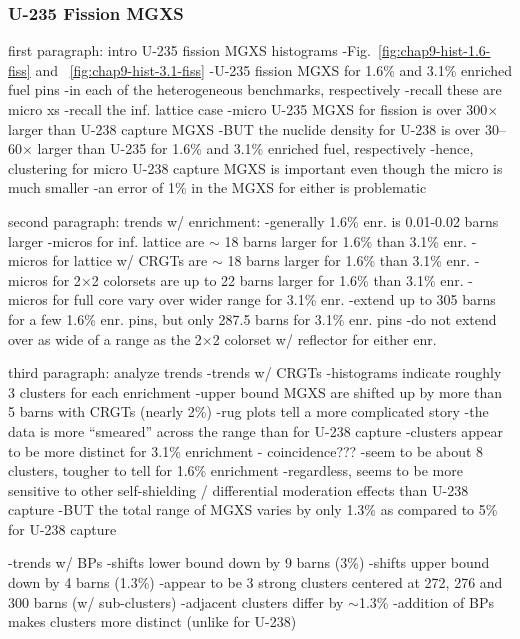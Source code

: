 \subsubsection{U-235 Fission MGXS}
\label{subsubsec:chap9-histograms-fiss}

first paragraph: intro U-235 fission \ac{MGXS} histograms
-Fig.~\ref{fig:chap9-hist-1.6-fiss} and ~\ref{fig:chap9-hist-3.1-fiss}
  -U-235 fission \ac{MGXS} for 1.6\% and 3.1\% enriched fuel pins
  -in each of the heterogeneous benchmarks, respectively
-recall these are micro xs
-recall the inf. lattice case
-micro U-235 \ac{MGXS} for fission is over 300$\times$ larger than U-238 capture \ac{MGXS}
  -BUT the nuclide density for U-238 is over 30--60$\times$ larger than U-235 for 1.6\% and 3.1\% enriched fuel, respectively
  -hence, clustering for micro U-238 capture \ac{MGXS} is important even though the micro is much smaller
  -an error of 1\% in the \ac{MGXS} for either is problematic

second paragraph: trends w/ enrichment:
-generally 1.6\% enr. is 0.01-0.02 barns larger
  -micros for inf. lattice are $\sim$ 18 barns larger for 1.6\% than 3.1\% enr.
  -micros for lattice w/ \acp{CRGT} are $\sim$ 18 barns larger for 1.6\% than 3.1\% enr.
  -micros for 2$\times$2 colorsets are up to 22 barns larger for 1.6\% than 3.1\% enr.
  -micros for full core vary over wider range for 3.1\% enr.
    -extend up to 305 barns for a few 1.6\% enr. pins, but only 287.5 barns for 3.1\% enr. pins
    -do not extend over as wide of a range as the 2$\times$2 colorset w/ reflector for either enr.

third paragraph: analyze trends
-trends w/ \acp{CRGT}
  -histograms indicate roughly 3 clusters for each enrichment
  -upper bound \ac{MGXS} are shifted up by more than 5 barns with \acp{CRGT} (nearly 2\%)
  -rug plots tell a more complicated story
    -the data is more ``smeared'' across the range than for U-238 capture
    -clusters appear to be more distinct for 3.1\% enrichment - coincidence???
      -seem to be about 8 clusters, tougher to tell for 1.6\% enrichment
      -regardless, seems to be more sensitive to other self-shielding / differential moderation effects than U-238 capture
        -BUT the total range of MGXS varies by only 1.3\% as compared to 5\% for U-238 capture

-trends w/ \acp{BP}
  -shifts lower bound down by 9 barns (3\%)
  -shifts upper bound down by 4 barns (1.3\%)
  -appear to be 3 strong clusters centered at 272, 276 and 300 barns (w/ sub-clusters)
    -adjacent clusters differ by $\sim$1.3\%
  -addition of \acp{BP} makes clusters more distinct (unlike for U-238)
  
